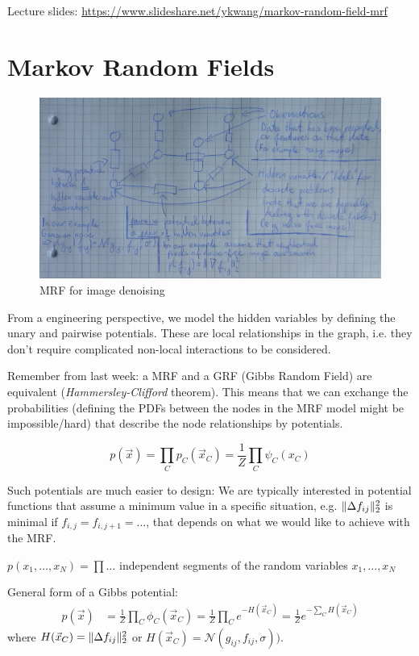 \documentclass{scrartcl}
\DeclarePairedDelimiter\norm{\lVert}{\rVert}%
\begin{document}
Lecture slides: \url{https://www.slideshare.net/ykwang/markov-random-field-mrf} 

\section{Markov Random Fields}
\begin{figure}[ht]
	\centering
    \includegraphics[scale=0.15]{img/mrf_1.jpg}
	\caption{MRF for image denoising}
	\label{fig:mrf_1}
\end{figure}

From a engineering perspective, we model the hidden variables by defining the unary and pairwise potentials. These are local relationships in the graph, i.e. they don't require complicated non-local interactions to be considered.

Remember from last week: a MRF and a GRF (Gibbs Random Field) are equivalent (\textit{Hammersley-Clifford} theorem).
This means that we can exchange the probabilities (defining the PDFs between the nodes in the MRF model might be impossible/hard) that describe the node relationships by potentials.

\[p(\vec{x}) = \prod_C p_C(\vec{x}_C) = \frac{1}{Z} \prod_C \psi_C(x_C)\]

Such potentials are much easier to design: We are typically interested in potential functions that assume a minimum value in a specific situation, e.g. \(\norm{\Delta f_{ij}}_2^2\) is minimal if \(f_{i,j} = f_{i,j+1} = \dots\), that depends on what we would like to achieve with the MRF.

\(p(x_1, \dots, x_N) = \prod \dots\) independent segments of the random variables \(x_1, \dots, x_N\)

General form of a Gibbs potential:
\begin{align*}
    p(\vec{x}) &= \frac{1}{Z} \prod_C \phi_C (\vec{x}_C)
    = \frac{1}{Z} \prod_C e^{-H(\vec{x}_C)}
    = \frac{1}{Z} e^{- \sum_C H(\vec{x}_C)}
\end{align*}
where \(H(\vec{x}_C) = \norm{\Delta f_{ij}}_2^2\) or \(H(\vec{x}_C) = \mathcal{N}(g_{ij}, f_{ij}, \sigma))\).
\end{document}
